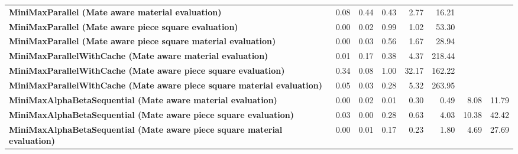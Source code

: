 \begin{table}[H]
{\begin{tabular}{|p{8cm}|*{7}{r|}}
            \rowcolor[HTML]{FFFFFF}
            \textbf{MiniMaxParallel (Mate aware material evaluation)}                                  & 0.08                                  & 0.44                                  & 0.43                                  & 2.77                                  & 16.21 &  &  \\
            \rowcolor[HTML]{EFEFEF}
            \textbf{MiniMaxParallel (Mate aware piece square evaluation)}                              & 0.00                                  & 0.02                                  & 0.99                                  & 1.02 & 53.30 &  &  \\
            \rowcolor[HTML]{FFFFFF}
            \textbf{MiniMaxParallel (Mate aware piece square material evaluation)}                     & 0.00                                  & 0.03 & 0.56 & 1.67 & 28.94 &  &  \\

            \rowcolor[HTML]{EFEFEF}
            \textbf{MiniMaxParallelWithCache (Mate aware material evaluation)}                         & 0.01                                  & 0.17                                  & 0.38 & 4.37 & 218.44 &  &  \\
            \rowcolor[HTML]{FFFFFF}
            \textbf{MiniMaxParallelWithCache (Mate aware piece square evaluation)}                     & 0.34                                  & 0.08 & 1.00 & 32.17 & 162.22 &  &  \\
            \rowcolor[HTML]{EFEFEF}
            \textbf{MiniMaxParallelWithCache (Mate aware piece square material evaluation)}            & 0.05 & 0.03 & 0.28 & 5.32 & 263.95 &  &  \\

            \rowcolor[HTML]{FFFFFF}
            \textbf{MiniMaxAlphaBetaSequential (Mate aware material evaluation)}                       & 0.00                                  & 0.02                                  & 0.01 & 0.30 & 0.49 & 8.08 & 11.79 \\
            \rowcolor[HTML]{EFEFEF}
            \textbf{MiniMaxAlphaBetaSequential (Mate aware piece square evaluation)}                   & 0.03                                  & 0.00 & 0.28 & 0.63 & 4.03 & 10.38 & 42.42 \\
            \rowcolor[HTML]{FFFFFF}
            \textbf{MiniMaxAlphaBetaSequential (Mate aware piece square material evaluation)}               & 0.00 & 0.01 & 0.17 & 0.23 & 1.80 & 4.69 & 27.69 \\


\end{tabular}}
\end{table}
